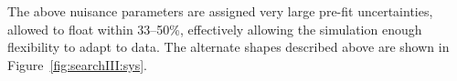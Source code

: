 The above nuisance parameters are assigned very large pre-fit uncertainties, allowed to float within 33--50\%, effectively allowing the simulation enough flexibility to adapt to data. The alternate shapes described above are shown in Figure~\ref{fig:searchIII:sys}.
\begin{figure}[h!]
\centering
{}
\\

\end{figure}
